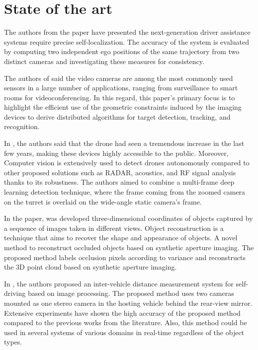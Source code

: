\chapter{State of the art} \label{capitulo2}

The authors from the paper \cite{Lategahn2013} have presented the next-generation driver assistance systems require precise self-localization. The accuracy of the system is evaluated by computing two independent ego positions of the same trajectory from two distinct cameras and investigating these measures for consistency.

The authors of  \cite{Sankaranarayanan2008} said the video cameras are among the most commonly used sensors in a large number of applications, ranging from surveillance to smart rooms for videoconferencing. In this regard, this paper's primary focus is to highlight the efficient use of the geometric constraints induced by the imaging devices to derive distributed algorithms for target detection, tracking, and recognition.


In \cite{Unlu2019}, the authors said that the drone had seen a tremendous increase in the last few years, making these devices highly accessible to the public. Moreover, Computer vision is extensively used to detect drones autonomously compared to other proposed solutions such as RADAR, acoustics, and RF signal analysis thanks to its robustness. The authors aimed to combine a multi-frame deep learning detection technique, where the frame coming from the zoomed camera on the turret is overlaid on the wide-angle static camera's frame.


In the paper, \cite{Pei2019} was developed three-dimensional coordinates of objects captured by a sequence of images taken in different views. Object reconstruction is a technique that aims to recover the shape and appearance of objects. A novel method to reconstruct occluded objects based on synthetic aperture imaging. The proposed method labels occlusion pixels according to variance and reconstructs the 3D point cloud based on synthetic aperture imaging.


In \cite{Zaarane2020}, the authors proposed an inter-vehicle distance measurement system for self-driving based on image processing. The proposed method uses two cameras mounted as one stereo camera in the hosting vehicle behind the rear-view mirror.  Extensive experiments have shown the high accuracy of the proposed method compared to the previous works from the literature. Also, this method could be used in several systems of various domains in real-time regardless of the object types.

